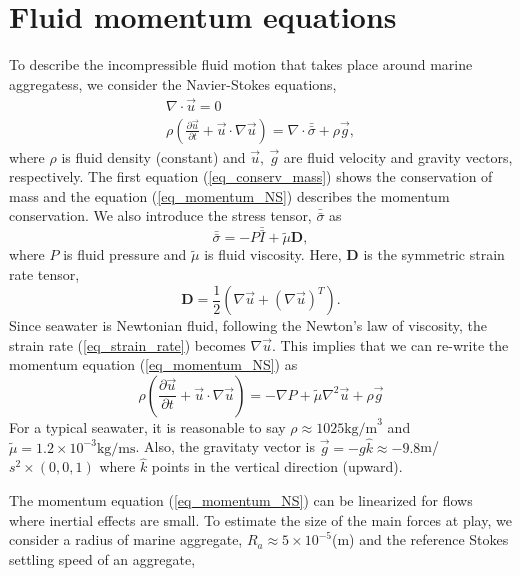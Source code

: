 \section{Fluid momentum equations}
To describe the incompressible fluid motion that takes place around marine aggregatess, we consider the Navier-Stokes equations,
\begin{align}
\nabla \cdot \vec{u} = 0 
\label{eq_conserv_mass} \\
\rho 
\left( 
   \frac{\partial \vec{u}}{\partial t} + \vec{u}\cdot \nabla \vec{u}
\right)
  = \nabla \cdot \bar{\bar{\sigma}} +  \rho  \vec{g} ,
\label{eq_momentum_NS}
\end{align}
where $ \rho$ is fluid density (constant) and $\vec{u}, \ \vec{g}$ are fluid velocity and gravity vectors, respectively.
The first equation (\ref{eq_conserv_mass}) shows the conservation of mass and the equation (\ref{eq_momentum_NS}) describes the momentum conservation. 
We also introduce the stress tensor, $\bar{\bar{\sigma}}$ as 
\begin{equation}
   \bar{\bar{\sigma}} = -P \bar{\bar{I}} + {\tilde{\mu}} {\bm D},
   \label{eq_stress_tensor}
\end{equation}
where $P$ is fluid pressure and ${\tilde{\mu}}$ is fluid viscosity. Here, ${\bm D}$ is the symmetric strain rate tensor,
\begin{equation}
   \boldsymbol{D} = \frac{1}{2} \left( \nabla \vec{u} + (\nabla  \vec{u})^T \right).
   \label{eq_strain_rate}
   \end{equation}
Since seawater is Newtonian fluid, following the Newton's law of viscosity, the strain rate (\ref{eq_strain_rate}) becomes $\nabla \vec{u}$. This implies that we can re-write the momentum equation (\ref{eq_momentum_NS}) as
\begin{equation}
  \rho \left( 
   \frac{\partial \vec{u}}{\partial t} + \vec{u}\cdot \nabla \vec{u}
\right)
  = -\nabla P  + {\tilde{\mu}} \nabla^2 \vec{u}+  \rho  \vec{g} 
\end{equation}
For a typical seawater, it is reasonable to say $\rho \approx 1025 \text{kg/m}^3$ and ${\tilde{\mu}} = 1.2 \times 10^{-3}\text{kg}/\text{ms}$.
Also, the gravitaty vector is $\vec{g} = - g\hat{k} \approx -9.8$m/$s^2 \times (0,0,1)$ where $\hat{k}$ points in the vertical direction (upward). 
\par
 The momentum equation (\ref{eq_momentum_NS}) can be linearized for flows where inertial effects are small. 
To estimate the size of the main forces at play, we consider a radius of marine aggregate, $R_a \approx 5 \times 10^{-5}$(m) and the reference Stokes settling speed of an aggregate,
